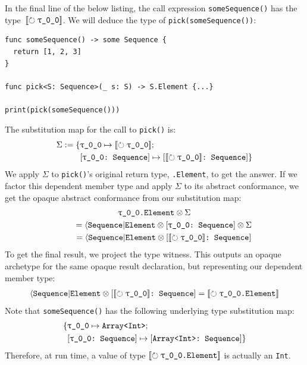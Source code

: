 \documentclass[../generics]{subfiles}
\begin{document}
\begin{example}\label{opaque type witness example}
In the final line of the below listing, the call expression \texttt{someSequence()} has the type~$\Ox$. We will deduce the type of \texttt{pick(someSequence())}:
\begin{Verbatim}
func someSequence() -> some Sequence {
  return [1, 2, 3]
}

func pick<S: Sequence>(_ s: S) -> S.Element {...}

print(pick(someSequence()))
\end{Verbatim}
The substitution map for the call to \texttt{pick()} is:
\begin{align*}
\Sigma := \SubstMapC{&\SubstType{\rT}{$\Ox$}}{\\
&\SubstConf{\rT}{$\Ox$}{Sequence}}
\end{align*}
We apply $\Sigma$ to \texttt{pick()}'s original return type, \texttt{\rT.Element}, to get the answer. If we factor this dependent member type and apply $\Sigma$ to its abstract conformance, we get the opaque abstract conformance from our substitution map:
\begin{gather*}
\texttt{\rT.Element} \otimes \Sigma \\
\qquad {} = \AElement \otimes \ConfReq{\rT}{Sequence} \otimes \Sigma \\
\qquad {} = \AElement \otimes \ConfReq{$\Ox$}{Sequence}
\end{gather*}
To get the final result, we project the type witness. This outputs an opaque archetype for the same opaque result declaration, but representing our dependent member type:
\begin{gather*}
\AElement \otimes \ConfReq{$\Ox$}{Sequence} = \Opaque{\rT.Element}
\end{gather*}
Note that \texttt{someSequence()} has the following underlying type substitution map:
\begin{align*}
\SubstMapC{&\SubstType{\rT}{Array<Int>}}{\\
&\SubstConf{\rT}{Array<Int>}{Sequence}}
\end{align*}
Therefore, at run time, a value of type $\Opaque{\rT.Element}$ is actually an \texttt{Int}.
\end{example}
\end{document}

